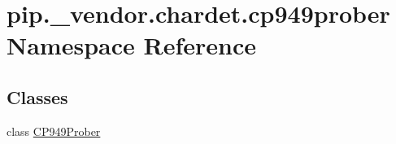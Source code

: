 \hypertarget{namespacepip_1_1__vendor_1_1chardet_1_1cp949prober}{}\section{pip.\+\_\+vendor.\+chardet.\+cp949prober Namespace Reference}
\label{namespacepip_1_1__vendor_1_1chardet_1_1cp949prober}
\subsection*{Classes}
\begin{DoxyCompactItemize}
\item 
class \hyperlink{classpip_1_1__vendor_1_1chardet_1_1cp949prober_1_1CP949Prober}{C\+P949\+Prober}
\end{DoxyCompactItemize}
